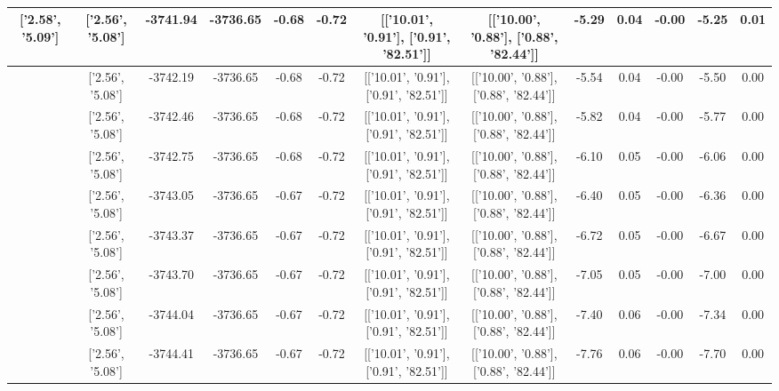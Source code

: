 \begin{table}[htbp]
\begin{adjustbox}{angle=90}
\begin{tabular}{|c|c|c|c|c|c|c|c|c|c|c|c|c|}
 ['2.58', '5.09'] & ['2.56', '5.08'] & -3741.94 & -3736.65 & -0.68 & -0.72 & [['10.01', '0.91'], ['0.91', '82.51']] & [['10.00', '0.88'], ['0.88', '82.44']] & -5.29 & 0.04 & -0.00 & -5.25 & 0.01\\ \hline
 ['2.58', '5.09'] & ['2.56', '5.08'] & -3742.19 & -3736.65 & -0.68 & -0.72 & [['10.01', '0.91'], ['0.91', '82.51']] & [['10.00', '0.88'], ['0.88', '82.44']] & -5.54 & 0.04 & -0.00 & -5.50 & 0.00\\ \hline
 ['2.59', '5.09'] & ['2.56', '5.08'] & -3742.46 & -3736.65 & -0.68 & -0.72 & [['10.01', '0.91'], ['0.91', '82.51']] & [['10.00', '0.88'], ['0.88', '82.44']] & -5.82 & 0.04 & -0.00 & -5.77 & 0.00\\ \hline
 ['2.59', '5.09'] & ['2.56', '5.08'] & -3742.75 & -3736.65 & -0.68 & -0.72 & [['10.01', '0.91'], ['0.91', '82.51']] & [['10.00', '0.88'], ['0.88', '82.44']] & -6.10 & 0.05 & -0.00 & -6.06 & 0.00\\ \hline
 ['2.59', '5.09'] & ['2.56', '5.08'] & -3743.05 & -3736.65 & -0.67 & -0.72 & [['10.01', '0.91'], ['0.91', '82.51']] & [['10.00', '0.88'], ['0.88', '82.44']] & -6.40 & 0.05 & -0.00 & -6.36 & 0.00\\ \hline
 ['2.59', '5.09'] & ['2.56', '5.08'] & -3743.37 & -3736.65 & -0.67 & -0.72 & [['10.01', '0.91'], ['0.91', '82.51']] & [['10.00', '0.88'], ['0.88', '82.44']] & -6.72 & 0.05 & -0.00 & -6.67 & 0.00\\ \hline
 ['2.59', '5.09'] & ['2.56', '5.08'] & -3743.70 & -3736.65 & -0.67 & -0.72 & [['10.01', '0.91'], ['0.91', '82.51']] & [['10.00', '0.88'], ['0.88', '82.44']] & -7.05 & 0.05 & -0.00 & -7.00 & 0.00\\ \hline
 ['2.59', '5.09'] & ['2.56', '5.08'] & -3744.04 & -3736.65 & -0.67 & -0.72 & [['10.01', '0.91'], ['0.91', '82.51']] & [['10.00', '0.88'], ['0.88', '82.44']] & -7.40 & 0.06 & -0.00 & -7.34 & 0.00\\ \hline
 ['2.59', '5.09'] & ['2.56', '5.08'] & -3744.41 & -3736.65 & -0.67 & -0.72 & [['10.01', '0.91'], ['0.91', '82.51']] & [['10.00', '0.88'], ['0.88', '82.44']] & -7.76 & 0.06 & -0.00 & -7.70 & 0.00\\ \hline
            \end{tabular}
        \end{adjustbox}
        \caption{}
        \label{}
    \end{table}
    